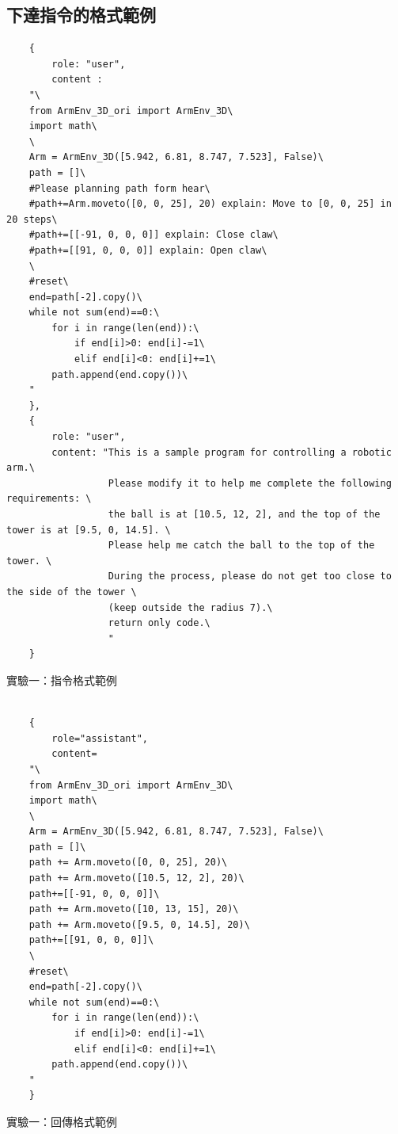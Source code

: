 \documentclass[class=NCU_thesis, crop=false]{standalone}
\begin{document}
\subsection{下達指令的格式範例}
\begin{listing}
    \begin{verbatim}
    {     
        role: "user",
        content : 
    "\
    from ArmEnv_3D_ori import ArmEnv_3D\
    import math\
    \
    Arm = ArmEnv_3D([5.942, 6.81, 8.747, 7.523], False)\
    path = []\
    #Please planning path form hear\
    #path+=Arm.moveto([0, 0, 25], 20) explain: Move to [0, 0, 25] in 20 steps\
    #path+=[[-91, 0, 0, 0]] explain: Close claw\
    #path+=[[91, 0, 0, 0]] explain: Open claw\
    \
    #reset\
    end=path[-2].copy()\
    while not sum(end)==0:\
        for i in range(len(end)):\
            if end[i]>0: end[i]-=1\
            elif end[i]<0: end[i]+=1\
        path.append(end.copy())\
    "
    },
    {
        role: "user", 
        content: "This is a sample program for controlling a robotic arm.\
                  Please modify it to help me complete the following requirements: \
                  the ball is at [10.5, 12, 2], and the top of the tower is at [9.5, 0, 14.5]. \
                  Please help me catch the ball to the top of the tower. \
                  During the process, please do not get too close to the side of the tower \
                  (keep outside the radius 7).\
                  return only code.\
                  "
    }
    \end{verbatim}
\caption{實驗一：指令格式範例} 
\end{listing}

\begin{listing}
    \begin{verbatim}

    {
        role="assistant",
        content=
    "\
    from ArmEnv_3D_ori import ArmEnv_3D\
    import math\
    \
    Arm = ArmEnv_3D([5.942, 6.81, 8.747, 7.523], False)\
    path = []\
    path += Arm.moveto([0, 0, 25], 20)\
    path += Arm.moveto([10.5, 12, 2], 20)\
    path+=[[-91, 0, 0, 0]]\
    path += Arm.moveto([10, 13, 15], 20)\
    path += Arm.moveto([9.5, 0, 14.5], 20)\
    path+=[[91, 0, 0, 0]]\
    \
    #reset\
    end=path[-2].copy()\
    while not sum(end)==0:\
        for i in range(len(end)):\
            if end[i]>0: end[i]-=1\
            elif end[i]<0: end[i]+=1\
        path.append(end.copy())\
    "
    }

    \end{verbatim}
\caption{實驗一：回傳格式範例} 
\end{listing}
\end{document}

